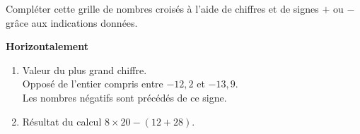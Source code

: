 
\begin{enigme}
    Compléter cette grille de nombres croisés à l'aide de chiffres et de signes \og $+$ \fg{} ou \og $-$ \fg{} grâce aux indications données.
    \begin{center}
    {\renewcommand{\arraystretch}{1.95}
    }
    \end{center}
    \bigskip
    \begin{multicols}{2}
        {\bf Horizontalement}
        \begin{enumerate}
            \item Valeur du plus grand chiffre. \\
                Opposé de l'entier compris entre $-12,2$ et $-13,9$. \\
                Les nombres négatifs sont précédés de ce signe. \\
            \item Résultat du calcul $8\times20-(12+28)$. \\

\end{enumerate}
\end{multicols}
\end{enigme}
